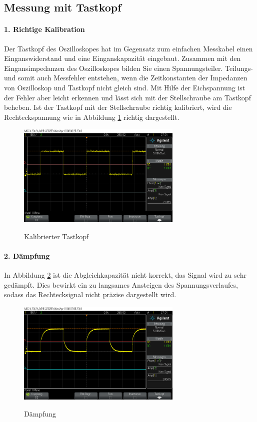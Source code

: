 \documentclass[a4paper]{article}
\begin{document}
    \subsection{Messung mit Tastkopf}
    \paragraph{1. Richtige Kalibration}
    Der Tastkopf des Oszilloskopes hat im Gegensatz zum einfachen Messkabel einen Einganswiderstand und eine Einganskapazität eingebaut. Zusammen mit den Eingansimpedanzen des Oszilloskopes bilden Sie einen Spannungsteiler. Teilungs- und somit auch Messfehler entstehen, wenn die Zeitkonstanten der Impedanzen von Oszilloskop und Tastkopf nicht gleich sind. Mit Hilfe der Eichspannung ist der Fehler aber leicht erkennen und lässt sich mit der Stellschraube am Tastkopf beheben.
    Ist der Tastkopf mit der Stellschraube richtig kalibriert, wird die Rechteckspannung wie in Abbildung \ref{fig:spitzefixed} richtig dargestellt.
    \begin{figure}
    \caption{Kalibrierter Tastkopf}
    \centering
    \includegraphics[width=0.7\textwidth]{spitzefixed}
    \label{fig:spitzefixed}
    \end{figure}
    
    \paragraph{2. Dämpfung}
    In Abbildung \ref{fig:spitze1} ist die Abgleichkapazität nicht korrekt, das Signal wird zu sehr gedämpft. Dies bewirkt ein zu langsames Ansteigen des Spannungsverlaufes, sodass das Rechtecksignal nicht präzise dargestellt wird.
    \begin{figure}
    \caption{Dämpfung}
    \centering
    \includegraphics[width=0.7\textwidth]{spitze1}
    \label{fig:spitze1}
    \end{figure}
    
\end{document}
